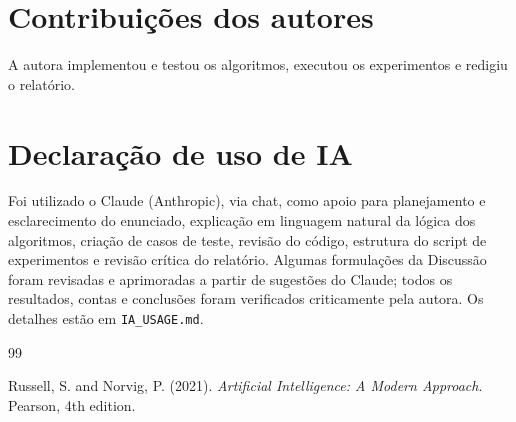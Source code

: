 \documentclass[12pt]{article}
\begin{document}
\section*{Contribuições dos autores}
A autora implementou e testou os algoritmos, executou os experimentos e redigiu o relatório.

\section*{Declaração de uso de IA}
Foi utilizado o Claude (Anthropic), via chat, como apoio para planejamento e esclarecimento do enunciado, explicação em linguagem natural da lógica dos algoritmos, criação de casos de teste, revisão do código, estrutura do script de experimentos e revisão crítica do relatório. Algumas formulações da Discussão foram revisadas e aprimoradas a partir de sugestões do Claude; todos os resultados, contas e conclusões foram verificados criticamente pela autora. Os detalhes estão em \texttt{IA\_USAGE.md}.

\begin{thebibliography}{99}

Russell, S. and Norvig, P. (2021). \textit{Artificial Intelligence: A Modern Approach}. Pearson, 4th edition.

\end{thebibliography}
\end{document}

